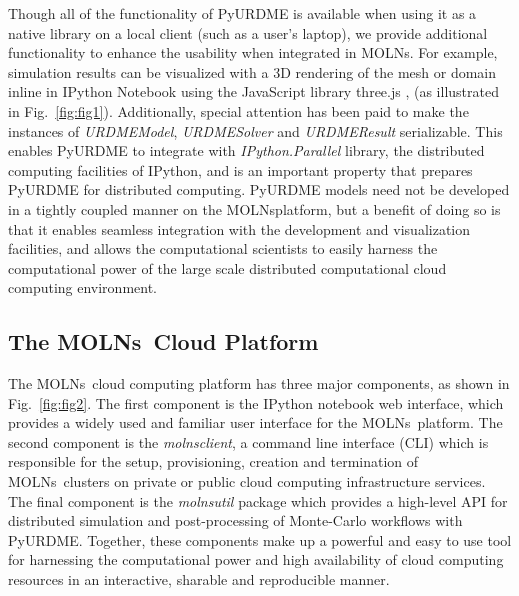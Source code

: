 \documentclass[final,leqno,onefignum,onetabnum]{siamltex1213}
\def\packagename {MOLNs}
\begin{document}
Though all of the functionality of PyURDME is available when using it as a native library on a local client (such as a user's laptop), we provide additional functionality to enhance the usability when integrated in \packagename. For example, simulation results can be visualized with a 3D rendering of the mesh or domain inline in IPython Notebook using the JavaScript library three.js \cite{ThreeJS}, (as illustrated in Fig.~\ref{fig:fig1}). Additionally, special attention has been paid to make the instances of \emph{URDMEModel}, \emph{URDMESolver} and \emph{URDMEResult} serializable.  This enables PyURDME to integrate with \emph{IPython.Parallel} library, the distributed computing facilities of IPython, and is an important property that prepares PyURDME for distributed computing. PyURDME models need not be developed in a tightly coupled manner on the \packagename platform, but a benefit of doing so is that it enables seamless integration with the development and visualization facilities, and allows the computational scientists to easily harness the computational power of the large scale distributed computational cloud computing environment.  
 
\subsection{The \packagename~Cloud Platform}

The  \packagename~cloud computing platform has three major components, as shown in Fig.~\ref{fig:fig2}. The first component is the IPython notebook web interface, which provides a widely used and familiar user interface for the \packagename~platform. The second component is the \emph{molnsclient}, a command line interface (CLI) which is responsible for the setup, provisioning, creation and termination of \packagename~clusters on private or public cloud computing infrastructure services.  The final component is the \emph{molnsutil} package which provides a high-level API for distributed simulation and post-processing of Monte-Carlo workflows with PyURDME.  Together, these components make up a powerful and easy to use tool for harnessing the computational power and high availability of cloud computing resources in an interactive, sharable and reproducible manner. 
\end{document}

